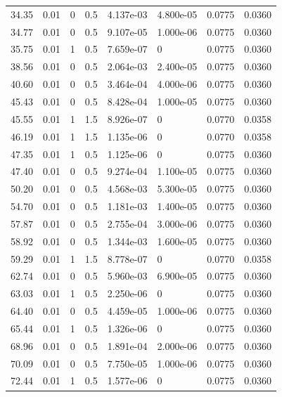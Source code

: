 \documentclass[preview]{standalone}
\begin{document}
{{\begin{tabular}{L{1.2cm}C{1.2cm} C{0.3cm}C{0.5cm} C{1.4cm}C{1.4cm} C{1.4cm}C{1.4cm}}
  34.35  &  0.01  & 0     & 0.5 &  4.137e-03  & 4.800e-05  & 0.0775 &  0.0360   \\ 
  34.77  &  0.01  & 0     & 0.5 &  9.107e-05  & 1.000e-06  & 0.0775 &  0.0360   \\ 
  35.75  &  0.01  & 1     & 0.5 &  7.659e-07  & 0  & 0.0775 &  0.0360   \\ 
  38.56  &  0.01  & 0     & 0.5 &  2.064e-03  & 2.400e-05  & 0.0775 &  0.0360   \\ 
  40.60  &  0.01  & 0     & 0.5 &  3.464e-04  & 4.000e-06  & 0.0775 &  0.0360   \\ 
  45.43  &  0.01  & 0     & 0.5 &  8.428e-04  & 1.000e-05  & 0.0775 &  0.0360   \\ 
  45.55  &  0.01  & 1     & 1.5 &  8.926e-07  & 0  & 0.0770 &  0.0358   \\ 
  46.19  &  0.01  & 1     & 1.5 &  1.135e-06  & 0  & 0.0770 &  0.0358   \\ 
  47.35  &  0.01  & 1     & 0.5 &  1.125e-06  & 0  & 0.0775 &  0.0360   \\ 
  47.40  &  0.01  & 0     & 0.5 &  9.274e-04  & 1.100e-05  & 0.0775 &  0.0360   \\ 
  50.20  &  0.01  & 0     & 0.5 &  4.568e-03  & 5.300e-05  & 0.0775 &  0.0360   \\ 
  54.70  &  0.01  & 0     & 0.5 &  1.181e-03  & 1.400e-05  & 0.0775 &  0.0360   \\ 
  57.87  &  0.01  & 0     & 0.5 &  2.755e-04  & 3.000e-06  & 0.0775 &  0.0360   \\ 
  58.92  &  0.01  & 0     & 0.5 &  1.344e-03  & 1.600e-05  & 0.0775 &  0.0360   \\ 
  59.29  &  0.01  & 1     & 1.5 &  8.778e-07  & 0  & 0.0770 &  0.0358   \\ 
  62.74  &  0.01  & 0     & 0.5 &  5.960e-03  & 6.900e-05  & 0.0775 &  0.0360   \\ 
  63.03  &  0.01  & 1     & 0.5 &  2.250e-06  & 0  & 0.0775 &  0.0360   \\ 
  64.40  &  0.01  & 0     & 0.5 &  4.459e-05  & 1.000e-06  & 0.0775 &  0.0360   \\ 
  65.44  &  0.01  & 1     & 0.5 &  1.326e-06  & 0  & 0.0775 &  0.0360   \\ 
  68.96  &  0.01  & 0     & 0.5 &  1.891e-04  & 2.000e-06  & 0.0775 &  0.0360   \\ 
  70.09  &  0.01  & 0     & 0.5 &  7.750e-05  & 1.000e-06  & 0.0775 &  0.0360   \\ 
  72.44  &  0.01  & 1     & 0.5 &  1.577e-06  & 0  & 0.0775 &  0.0360   \\ 

\end{tabular}}}
\end{document}

